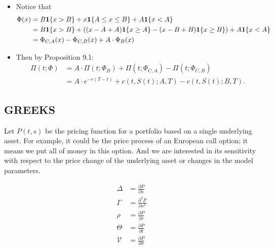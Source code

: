 \begin{example}
	\begin{itemize}
	\item Notice that 
	\begin{align*}
	\Phi(x) &= B \boldsymbol{1}\{ x > B \} +x \boldsymbol{1}\{ A\leq x \leq B \} + A \boldsymbol{1}\{ x<A \} \\
	&= B \boldsymbol{1}\{ x > B \} +\left(  (x-A + A) \boldsymbol{1}\{ x\geq A \}  - (x-B+B) \boldsymbol{1}\{ x \geq B \} \right) + A \boldsymbol{1}\{ x<A \} \\
	&= \Phi_{C,A}(x) - \Phi_{C,B}(x) + A\cdot \Phi_B(x)
	\end{align*} 
	
	\item Then by Proposition 9.1:
	\begin{align*}
	\Pi(t; \Phi) &= A \cdot \Pi(t; \Phi_B) + \Pi(t; \Phi_{C,A}) - \Pi(t; \Phi_{C, B}) \\
	&= A\cdot e^{-r(T-t)} + c(t,S(t); A, T) -  c(t,S(t); B, T) .
	\end{align*}
\end{itemize}
\end{example}

\subsection*{GREEKS}
Let $P(t,s)$ be the pricing function for a portfolio based on a single underlying asset. For example, it could be the price process of an European call option; it means we put all of money in this option. And we are interested in its sensitivity with respect to the price change of the underlying asset or changes in the model parameters. 
\begin{definition}[Greeks]
	\begin{align*}
	\Delta &= \frac{\partial P}{\partial s}\\
	\Gamma &= \frac{\partial^2 P}{\partial s^2}\\
	\rho &= \frac{\partial P}{\partial r}\\
	\Theta &=\frac{\partial P}{\partial t} \\
	\mathcal{V} &=  \frac{\partial P}{\partial \sigma}
	\end{align*} 
\end{definition} 


